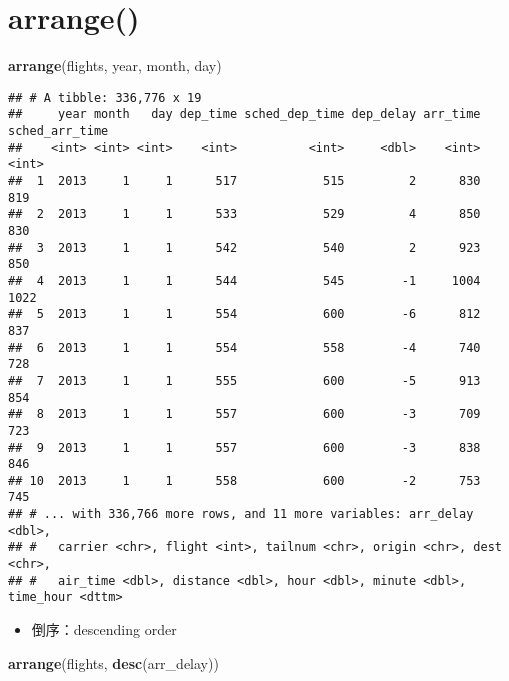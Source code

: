 \documentclass[
]{article}
\newenvironment{Shaded}{\begin{snugshade}}{\end{snugshade}}
\newcommand{\KeywordTok}[1]{\textcolor[rgb]{0.13,0.29,0.53}{\textbf{#1}}}
\newcommand{\NormalTok}[1]{#1}
\providecommand{\tightlist}{%
  \setlength{\itemsep}{0pt}\setlength{\parskip}{0pt}}
\begin{document}
\hypertarget{arrange}{%
\section{arrange()}\label{arrange}}

\begin{Shaded}
\begin{Highlighting}[]
\KeywordTok{arrange}\NormalTok{(flights, year, month, day)}
\end{Highlighting}
\end{Shaded}

\begin{verbatim}
## # A tibble: 336,776 x 19
##     year month   day dep_time sched_dep_time dep_delay arr_time sched_arr_time
##    <int> <int> <int>    <int>          <int>     <dbl>    <int>          <int>
##  1  2013     1     1      517            515         2      830            819
##  2  2013     1     1      533            529         4      850            830
##  3  2013     1     1      542            540         2      923            850
##  4  2013     1     1      544            545        -1     1004           1022
##  5  2013     1     1      554            600        -6      812            837
##  6  2013     1     1      554            558        -4      740            728
##  7  2013     1     1      555            600        -5      913            854
##  8  2013     1     1      557            600        -3      709            723
##  9  2013     1     1      557            600        -3      838            846
## 10  2013     1     1      558            600        -2      753            745
## # ... with 336,766 more rows, and 11 more variables: arr_delay <dbl>,
## #   carrier <chr>, flight <int>, tailnum <chr>, origin <chr>, dest <chr>,
## #   air_time <dbl>, distance <dbl>, hour <dbl>, minute <dbl>, time_hour <dttm>
\end{verbatim}

\begin{itemize}
\tightlist
\item
  倒序：descending order
\end{itemize}

\begin{Shaded}
\begin{Highlighting}[]
\KeywordTok{arrange}\NormalTok{(flights, }\KeywordTok{desc}\NormalTok{(arr_delay))}
\end{Highlighting}
\end{Shaded}
\end{document}
